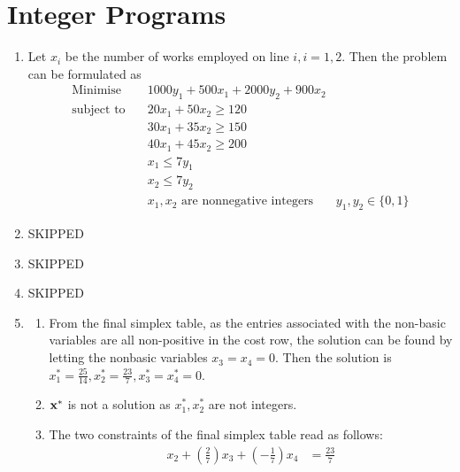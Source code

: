 \section{Integer Programs}

\begin{enumerate}
    \item Let \(x_i\) be the number of works employed on line \(i, i = 1, 2\). Then the problem can be formulated as
          \begin{align*}
              \text{Minimise} \quad   & 1000y_1 + 500x_1 + 2000y_2 + 900x_2       \\
              \text{subject to} \quad & 20x_1 + 50x_2 \geq 120                    \\
                                      & 30x_1 + 35x_2 \geq 150                    \\
                                      & 40x_1 + 45x_2 \geq 200                    \\
                                      & x_1 \leq 7y_1                             \\
                                      & x_2 \leq 7y_2                             \\
                                      & x_1, x_2 \text{ are nonnegative integers}
                                      & y_1, y_2 \in \{0, 1\}
          \end{align*}
    \item {\color{red} SKIPPED}
    \item {\color{red} SKIPPED}
    \item {\color{red} SKIPPED}
    \item \begin{enumerate}[label=(\arabic*)]
              \item From the final simplex table, as the entries associated with the non-basic variables are all non-positive in the cost row, the solution can be found by letting the nonbasic variables \(x_3 = x_4 = 0\). Then the solution is \(x_1^* = \frac{25}{14}, x_2^* = \frac{23}{7}, x_3^* = x_4^* = 0\).
              \item \(\mathbf{x}^*\) is not a solution as \(x_1^*, x_2^*\) are not integers.
              \item The two constraints of the final simplex table read as follows:
                    \begin{align*}
                        x_2 + \left(\frac{2}{7}\right)x_3 + \left(-\frac{1}{7}\right)x_4 & = \frac{23}{7} \\

\end{align*}
\end{enumerate}
\end{enumerate}
